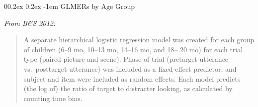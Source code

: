\documentclass[
  doc,floatsintext]{apa6}
\makeatletter
\let\oldparagraph\paragraph
\renewcommand{\paragraph}{
    \@ifstar
      \xxxParagraphStar
      \xxxParagraphNoStar
  }
\newcommand{\xxxParagraphStar}[1]{\oldparagraph*{#1}\mbox{}}
\newcommand{\xxxParagraphNoStar}[1]{\oldparagraph{#1}\mbox{}}
\renewcommand{\paragraph}{\@startsection{paragraph}{4}{\parindent}%
  {0\baselineskip \@plus 0.2ex \@minus 0.2ex}%
  {-1em}%
  {\normalfont\normalsize\bfseries\itshape\typesectitle}}
\makeatother
\begin{document}
\paragraph{GLMERs by Age Group}\label{glmers-by-age-group}

\emph{From B\&S 2012:}

\begin{quote}
A separate hierarchical logistic regression model was created
for each group of children (6--9 mo, 10--13 mo, 14--16 mo, and 18--
20 mo) for each trial type (paired-picture and scene). Phase of
trial (pretarget utterance vs.~posttarget utterance) was included
as a fixed-effect predictor, and subject and item were included
as random effects. Each model predicts (the log of) the ratio of
target to distracter looking, as calculated by counting time bins.
\end{quote}
\end{document}
